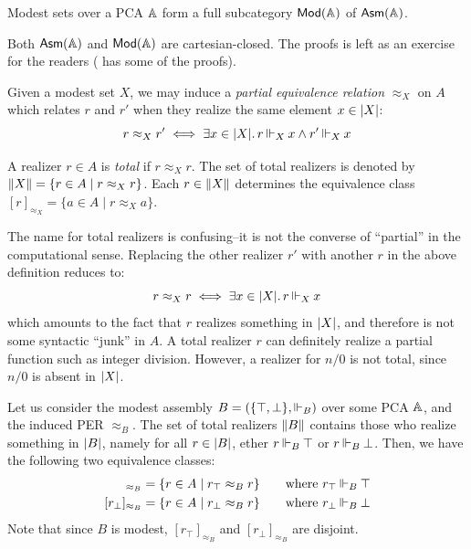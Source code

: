 \begin{fact}
    Modest sets over a PCA \(\mathbb{A}\) form a full subcategory \(\mathsf{Mod}(\mathbb{A})\) of \(\mathsf{Asm}(\mathbb{A})\).
\end{fact}

\begin{proposition}
    Both \(\mathsf{Asm}(\mathbb{A})\) and \(\mathsf{Mod}(\mathbb{A})\) are cartesian-closed.  The proofs is left as an exercise for the readers (\citep[Chapter 3.6]{bauer25:notes_realizability} has some of the proofs).
\end{proposition}

\begin{definition}
    Given a modest set \(X\), we may induce a \emph{partial equivalence relation} \(\approx_X\) on \(A\) which relates \(r\) and \(r'\) when they realize the same element \(x \in \vert X \vert\):
    \[
        r \approx_X r' \iff \exists x \in \vert X \vert.\,r \mathbin\Vdash_X x \land r' \mathbin\Vdash_X x
    \]
\end{definition}

\begin{definition}
    A realizer \(r \in A\) is \emph{total} if \(r \approx_X r\).  The set of total realizers is denoted by \(\Vert X \Vert = \{r \in A \mid r \approx_X r\}\).  Each \(r \in \Vert X \Vert\) determines the equivalence class \([r]_{\approx_X} = \{a \in A \mid r \approx_X a\}\).
\end{definition}

The name for total realizers is confusing--it is not the converse of ``partial'' in the computational sense.  Replacing the other realizer \(r'\) with another \(r\) in the above definition reduces to:
\[
        r \approx_X r \iff \exists x \in \vert X \vert.\,r \mathbin\Vdash_X x
\]
which amounts to the fact that \(r\) realizes something in \(\vert X \vert\), and therefore is not some syntactic ``junk'' in \(A\).
A total realizer \(r\) can definitely realize a partial function such as integer division.  However, a realizer for \(n/0\) is not total, since \(n/0\) is absent in \(\vert X \vert\).

\begin{example}
    Let us consider the modest assembly \(B = (\{\top, \bot\}, \mathbin\Vdash_B)\) over some PCA \(\mathbb{A}\), and the induced PER \(\approx_B\).  The set of total realizers \(\Vert B \Vert\) contains those who realize something in \(\vert B \vert\), namely for all \(r \in \vert B \vert\), ether \(r \mathbin\Vdash_B \top\) or \(r \mathbin\Vdash_B \bot\).  Then, we have the following two equivalence classes:
    \begin{align*}
        [r_{\top}]_{\approx_B} &= \{r \in A \mid r_{\top} \approx_B r\} \text{\qquad where \(r_{\top} \rzrz_B \top\)} \\
        [r_{\bot}]_{\approx_B} &= \{r \in A \mid r_{\bot} \approx_B r\} \text{\qquad where \(r_{\bot} \rzrz_B \bot\)}
    \end{align*}
    Note that since \(B\) is modest, \([r_{\top}]_{\approx_B}\) and \([r_{\bot}]_{\approx_B}\) are disjoint.
\end{example}

